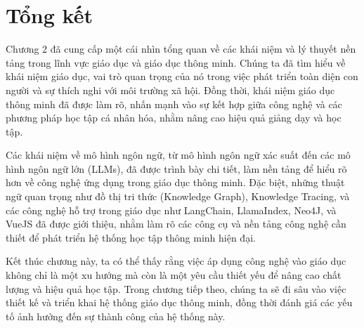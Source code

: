 \section{Tổng kết}
\par Chương 2 đã cung cấp một cái nhìn tổng quan về các khái niệm và lý thuyết nền tảng trong lĩnh vực giáo dục và giáo dục thông minh. Chúng ta đã tìm hiểu về khái niệm giáo dục, vai trò quan trọng của nó trong việc phát triển toàn diện con người và sự thích nghi với môi trường xã hội. Đồng thời, khái niệm giáo dục thông minh đã được làm rõ, nhấn mạnh vào sự kết hợp giữa công nghệ và các phương pháp học tập cá nhân hóa, nhằm nâng cao hiệu quả giảng dạy và học tập.

\par Các khái niệm về mô hình ngôn ngữ, từ mô hình ngôn ngữ xác suất đến các mô hình ngôn ngữ lớn (LLMs), đã được trình bày chi tiết, làm nền tảng để hiểu rõ hơn về công nghệ ứng dụng trong giáo dục thông minh. Đặc biệt, những thuật ngữ quan trọng như đồ thị tri thức (Knowledge Graph), Knowledge Tracing, và các công nghệ hỗ trợ trong giáo dục như LangChain, LlamaIndex, Neo4J, và VueJS đã được giới thiệu, nhằm làm rõ các công cụ và nền tảng công nghệ cần thiết để phát triển hệ thống học tập thông minh hiện đại.

\par Kết thúc chương này, ta có thể thấy rằng việc áp dụng công nghệ vào giáo dục không chỉ là một xu hướng mà còn là một yêu cầu thiết yếu để nâng cao chất lượng và hiệu quả học tập. Trong chương tiếp theo, chúng ta sẽ đi sâu vào việc thiết kế và triển khai hệ thống giáo dục thông minh, đồng thời đánh giá các yếu tố ảnh hưởng đến sự thành công của hệ thống này.